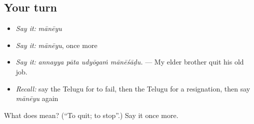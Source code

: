 \subsection*{Your turn}
\begin{itemize}
\raggedright
  \item \emph{Say it:} \emph{mānēyu}
  \item \emph{Say it:} \emph{mānēyu}, once more
  \item \emph{Say it:} \emph{annayya pāta udyōgaṁ mānēśāḍu.} — My elder brother quit his old job.
  \item \emph{Recall:} say the Telugu for to fail, then the Telugu for a resignation, then say \emph{mānēyu} again
\end{itemize}

\begin{tcolorbox}[breakable,colback=teal!4,colframe=teal!35!black,title={Before you move on}]
What does  mean? (\textquotedblleft{}To quit; to stop\textquotedblright{}.) Say it once more.
\end{tcolorbox}
